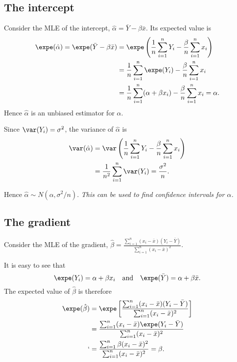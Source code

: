 \subsection{The intercept}
Consider the MLE of the intercept, $\hat{\alpha} = \bar{Y}-\beta\bar{x}$. Its expected value is
\begin{align*}
\expe(\hat{\alpha})
	= \expe(\bar{Y}-\beta\bar{x})
	& = \expe\left(\frac{1}{n}\sum_{i=1}^n Y_i - \frac{\beta}{n}\sum_{i=1}^n x_i\right) \\
	& = \frac{1}{n}\sum_{i=1}^n \expe(Y_i) - \frac{\beta}{n}\sum_{i=1}^n x_i \\
	& = \frac{1}{n}\sum_{i=1}^n (\alpha+\beta x_i) - \frac{\beta}{n}\sum_{i=1}^n x_i
	= \alpha.
\end{align*}
Hence $\hat{\alpha}$ is an unbiased estimator for $\alpha$.


Since $\var(Y_i)=\sigma^2$, the variance of $\hat{\alpha}$ is 
\begin{align*}
\var(\hat{\alpha})
	& = \var\left(\frac{1}{n}\sum_{i=1}^n Y_i - \frac{\beta}{n}\sum_{i=1}^n x_i\right) \\
	& = \frac{1}{n^2}\sum_{i=1}^n \var(Y_i)
	= \frac{\sigma^2}{n}.
\end{align*}

Hence $\hat{\alpha} \sim N(\alpha,\sigma^2/n)$.
\bit
\it This can be used to find confidence intervals for $\alpha$.
\eit


\subsection{The gradient}
Consider the MLE of the gradient, $\hat{\beta} = \displaystyle\frac{\sum_{i=1}^n (x_i-\bar{x})(Y_i-\bar{Y})}{\sum_{i=1}^n (x_i-\bar{x})^2}$. 

It is easy to see that
\[
\expe(Y_i) = \alpha + \beta x_i 
\text{\quad and\quad}
\expe(\bar{Y}) = \alpha + \beta\bar{x}.
\]
The expected value of $\hat{\beta}$ is therefore
\begin{align*}
\expe(\hat{\beta})
	& = \expe\left[\frac{\sum_{i=1}^n (x_i-\bar{x})(Y_i-\bar{Y})}{\sum_{i=1}^n (x_i-\bar{x})^2}\right] \\
	& = \frac{\sum_{i=1}^n (x_i-\bar{x})\expe(Y_i-\bar{Y})}{\sum_{i=1}^n (x_i-\bar{x})^2} \\
`	& = \frac{\sum_{i=1}^n \beta(x_i-\bar{x})^2}{\sum_{i=1}^n (x_i-\bar{x})^2} = \beta.
\end{align*}

